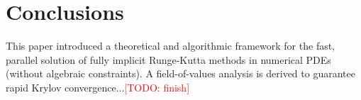 \documentclass[review]{siamart}
\makeatletter
\newcommand{\todo}[1]{\textcolor{red}{[TODO\@: #1]}}
\makeatother
\begin{document}
\section{Conclusions}\label{sec:conc}

This paper introduced a theoretical and algorithmic framework for the fast, parallel
solution of fully implicit Runge-Kutta methods in numerical PDEs (without algebraic
constraints). A field-of-values analysis is derived to guarantee rapid Krylov
convergence...\todo{finish}





\end{document}
